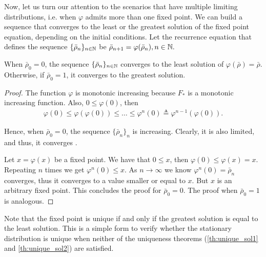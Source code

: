 Now, let us turn our attention to the scenarios that have multiple limiting distributions, i.e. when $\varphi$ admits more than one fixed point.
%
We can build a sequence that converges to the least or the greatest solution of the fixed point equation, depending on the initial conditions. Let the recurrence equation that defines the sequence $\{\bar\rho_n\}_{n\in{\mathbb N}}$ be
$
    {\bar\rho_{n+1} = \varphi(\bar\rho_n), n\in{\mathbb N}}.
$
\begin{proposition} \label{prop:sequence}
    When $\bar\rho_0 = 0$, the sequence $\{\bar\rho_n\}_{n\in{\mathbb N}}$ converges to the least solution of $\varphi(\bar\rho)=\bar\rho$. Otherwise, if ${\bar\rho_0 = 1}$, it converges to the greatest solution.
\end{proposition}
%
\begin{proof}
    The function $\varphi$ is monotonic increasing because $F_*$ is a monotonic increasing function.
    Also, $0 \le \varphi(0)$, then
    \begin{align*}
        \varphi(0) \le \varphi(\varphi(0)) \le \dots \le \varphi^n(0) \triangleq \varphi^{n-1}(\varphi(0)).
    \end{align*}
    
    Hence, when $\bar\rho_0 = 0$, the sequence $\{\bar\rho_n\}_n$ is increasing.
    Clearly, it is also limited, and thus, it converges \cite[Th.~3.14.]{rudin1976principles}.
    
    Let $x = \varphi(x)$ be a fixed point. We have that $0 \le x$, then $\varphi(0) \le \varphi(x) = x$. Repeating $n$ times we get $\varphi^n(0) \le x$.
    As $n\to\infty$ we know $\varphi^n(0) = \bar\rho_n$ converges, thus it converges to a value smaller or equal to $x$. But $x$ is an arbitrary fixed point. This concludes the proof for $\bar\rho_0=0$.
    The proof when $\bar\rho_0=1$ is analogous.
\end{proof}

Note that the fixed point is unique if and only if the greatest solution is equal to the least solution.
%
This is a simple form to verify whether the stationary distribution is unique when neither of the uniqueness theorems (\ref{th:unique_sol1} and \ref{th:unique_sol2}) are satisfied.

